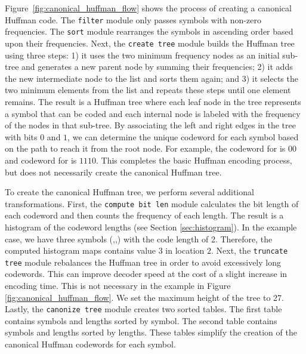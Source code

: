 Figure~\ref{fig:canonical_huffman_flow} shows the process of creating a canonical Huffman code. The \lstinline{filter} module only passes symbols with non-zero frequencies. The \lstinline{sort} module rearranges the symbols in ascending order based upon their frequencies. Next, the \lstinline{create tree} module builds the Huffman tree using three steps: 1) it uses the two minimum frequency nodes as an initial sub-tree and generates a new parent node by summing their frequencies; 2) it adds the new intermediate node to the list and sorts them again; and 3) it selects the two minimum elements from the list and repeats these steps until one element remains. The result is a Huffman tree where each leaf node in the tree represents a symbol that can be coded and each internal node is labeled with the frequency of the nodes in that sub-tree.  By associating the left and right edges in the tree with bits $0$ and $1$, we can determine the unique codeword for each symbol based on the path to reach it from the root node. For example, the codeword for  is $00$ and codeword for  is $1110$. This completes the basic Huffman encoding process, but does not necessarily create the canonical Huffman tree.

To create the canonical Huffman tree, we perform several additional transformations.   First, the \lstinline{compute bit len} module calculates the bit length of each codeword and then counts the frequency of each length. The result is a histogram of the codeword lengths (see Section \ref{sec:histogram}).  In the example case, we have three symbols (,,) with the code length of 2. Therefore, the computed histogram maps contains value $3$ in location $2$. Next, the \lstinline{truncate tree} module rebalances the Huffman tree in order to avoid excessively long codewords. This can improve decoder speed at the cost of a slight increase in encoding time. This is not necessary in the example in Figure \ref{fig:canonical_huffman_flow}. We set the maximum height of the tree to 27.  Lastly, the \lstinline{canonize tree} module creates two sorted tables. The first table contains symbols and lengths sorted by symbol. The second table contains symbols and lengths sorted by lengths. These tables simplify the creation of the canonical Huffman codewords for each symbol.

